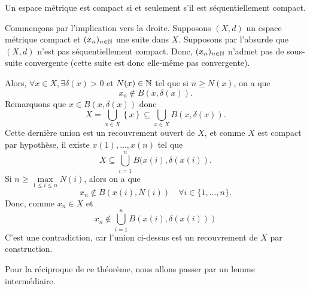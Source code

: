 \documentclass[french]{article}
\begin{document}
\begin{theoreme}
  Un espace métrique est compact si et seulement s'il est séquentiellement compact.

  \tcblower
  \begin{preuve}
    Commençons par l'implication vers la droite. Supposons $(X, d)$ un espace métrique compact et $(x_n)_{n \in \mathbb{N}}$ une suite dans $X$. Supposons par l'absurde que $(X, d)$ n'est pas séquentiellement compact. Donc, $(x_n)_{n \in \mathbb{N}}$ n'admet pas de sous-suite convergente (cette suite est donc elle-même pas convergente).
    \par Alors, $\forall x \in X, \exists \delta(x) > 0$ et $N(x) \in \mathbb{N}$ tel que si $n \geq N(x)$, on a que
    $$x_n \not \in B(x, \delta(x)).$$
    Remarquons que $x \in B(x, \delta(x))$ donc
    $$X = \bigcup_{x \in X} \left\{ x \right\} \subseteq \bigcup_{x \in X} B(x, \delta(x)).$$
    Cette dernière union est un recouvrement ouvert de $X$, et comme  $X$ est compact par hypothèse, il existe $x(1), \dots, x(n)$ tel que
    $$X \subseteq \bigcup_{i=1}^n B(x(i), \delta\left( x(i) \right).$$
    Si $n \geq \max\limits_{1 \leq i \leq n} N(i)$, alors on a que
    $$x_n \not \in B\left( x(i), N(i) \right) \quad \forall i \in \{1, \dots, n \}.$$
    Donc, comme $x_n \in X$ et 
    $$x_n \not \in \bigcup_{i=1}^n B(x(i), \delta(x(i)))$$
    C'est une contradiction, car l'union ci-dessus est un recouvrement de $X$ par construction.
  \end{preuve}
\end{theoreme}
Pour la réciproque de ce théorème, nous allons passer par un lemme intermédiaire.
\end{document}
